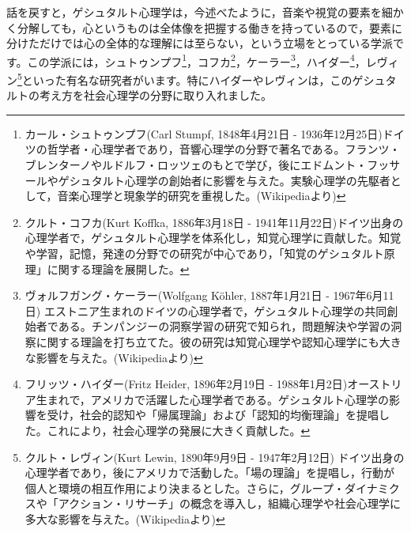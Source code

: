 \documentclass{ltjsbook}
\begin{document}
話を戻すと，ゲシュタルト心理学は，今述べたように，音楽や視覚の要素を細かく分解しても，心というものは全体像を把握する働きを持っているので，要素に分けただけでは心の全体的な理解には至らない，という立場をとっている学派です。この学派には，シュトゥンプフ\footnote{カール・シュトゥンプフ(Carl Stumpf, 1848年4月21日 - 1936年12月25日)ドイツの哲学者・心理学者であり，音響心理学の分野で著名である。フランツ・ブレンターノやルドルフ・ロッツェのもとで学び，後にエドムント・フッサールやゲシュタルト心理学の創始者に影響を与えた。実験心理学の先駆者として，音楽心理学と現象学的研究を重視した。(Wikipediaより)}，コフカ\footnote{クルト・コフカ(Kurt Koffka, 1886年3月18日 - 1941年11月22日)ドイツ出身の心理学者で，ゲシュタルト心理学を体系化し，知覚心理学に貢献した。知覚や学習，記憶，発達の分野での研究が中心であり，「知覚のゲシュタルト原理」に関する理論を展開した。}，ケーラー\footnote{ヴォルフガング・ケーラー(Wolfgang K\"ohler, 1887年1月21日 - 1967年6月11日)  エストニア生まれのドイツの心理学者で，ゲシュタルト心理学の共同創始者である。チンパンジーの洞察学習の研究で知られ，問題解決や学習の洞察に関する理論を打ち立てた。彼の研究は知覚心理学や認知心理学にも大きな影響を与えた。(Wikipediaより)}，ハイダー\footnote{フリッツ・ハイダー(Fritz Heider, 1896年2月19日 - 1988年1月2日)オーストリア生まれで，アメリカで活躍した心理学者である。ゲシュタルト心理学の影響を受け，社会的認知や「帰属理論」および「認知的均衡理論」を提唱した。これにより，社会心理学の発展に大きく貢献した。}，レヴィン\footnote{クルト・レヴィン(Kurt Lewin, 1890年9月9日 - 1947年2月12日) ドイツ出身の心理学者であり，後にアメリカで活動した。「場の理論」を提唱し，行動が個人と環境の相互作用により決まるとした。さらに，グループ・ダイナミクスや「アクション・リサーチ」の概念を導入し，組織心理学や社会心理学に多大な影響を与えた。(Wikipediaより)}といった有名な研究者がいます。特にハイダーやレヴィンは，このゲシュタルトの考え方を社会心理学の分野に取り入れました。
\end{document}
